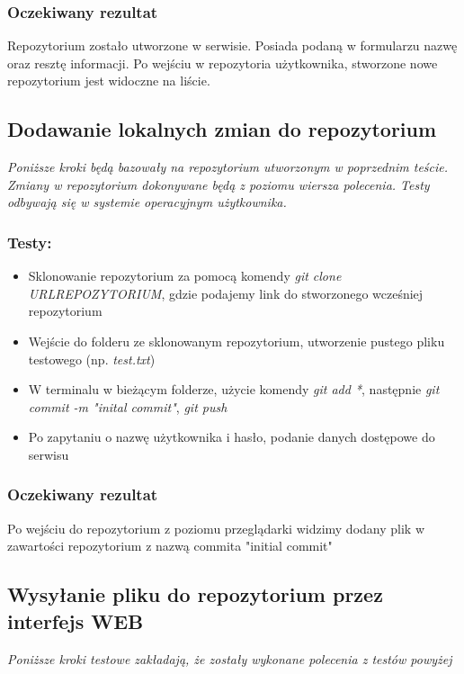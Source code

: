 \documentclass{article}
\begin{document}
\subsubsection*{Oczekiwany rezultat}
Repozytorium zostało utworzone w serwisie. Posiada podaną w formularzu nazwę oraz resztę informacji.
Po wejściu w repozytoria użytkownika, stworzone nowe repozytorium jest widoczne na liście.

\newpage

\subsection{Dodawanie lokalnych zmian do repozytorium}
\textit{Poniższe kroki będą bazowały na repozytorium utworzonym w poprzednim teście. Zmiany w repozytorium dokonywane będą z poziomu wiersza polecenia.
Testy odbywają się w systemie operacyjnym użytkownika.}
\subsubsection*{Testy:}
\begin{itemize}
    \item Sklonowanie repozytorium za pomocą komendy \textit{git clone URLREPOZYTORIUM}, gdzie podajemy link do stworzonego wcześniej repozytorium
    \item Wejście do folderu ze sklonowanym repozytorium, utworzenie pustego pliku testowego (np. \textit{test.txt})
    \item W terminalu w bieżącym folderze, użycie komendy \textit{git add *}, następnie \textit{git commit -m "inital commit"}, \textit{git push}
    \item Po zapytaniu o nazwę użytkownika i hasło, podanie danych dostępowe do serwisu
\end{itemize}

\subsubsection*{Oczekiwany rezultat}
Po wejściu do repozytorium z poziomu przeglądarki widzimy dodany plik w zawartości repozytorium z nazwą commita "initial commit"

\subsection{Wysyłanie pliku do repozytorium przez interfejs WEB}
\textit{Poniższe kroki testowe zakładają, że zostały wykonane polecenia z testów powyżej}
\end{document}
